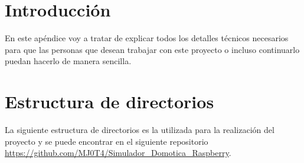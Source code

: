 
\section{Introducción}

En este apéndice voy a tratar de explicar todos los detalles técnicos necesarios para que las personas que desean trabajar con este proyecto o incluso continuarlo puedan hacerlo de manera sencilla.

\section{Estructura de directorios}

La siguiente estructura de directorios es la utilizada para la realización del proyecto y se puede encontrar en el siguiente repositorio \url{https://github.com/MJ0T4/Simulador_Domotica_Raspberry}.

